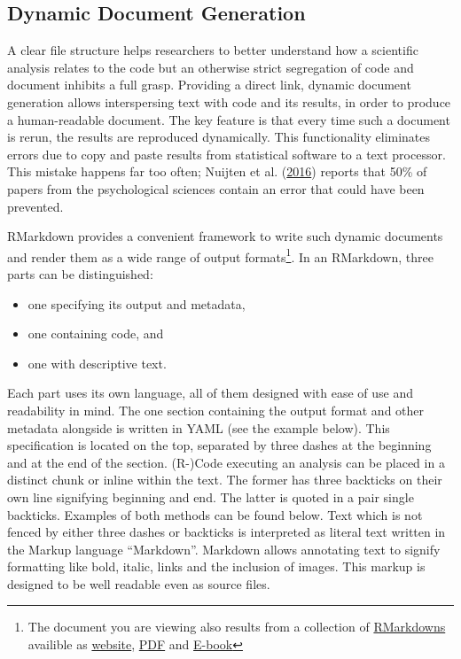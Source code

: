 \documentclass[12pt,a4paper,]{article}
\providecommand{\tightlist}{%
  \setlength{\itemsep}{0pt}\setlength{\parskip}{0pt}}
\begin{document}
\hypertarget{dynamic-document-generation}{%
\subsection{Dynamic Document Generation}\label{dynamic-document-generation}}

A clear file structure helps researchers to better understand how a scientific analysis relates to the code but an otherwise strict segregation of code and document inhibits a full grasp.
Providing a direct link, dynamic document generation allows interspersing text with code and its results, in order to produce a human-readable document.
The key feature is that every time such a document is rerun, the results are reproduced dynamically.
This functionality eliminates errors due to copy and paste results from statistical software to a text processor. This mistake happens far too often; Nuijten et al. (\protect\hyperlink{ref-nuijtenPrevalenceStatisticalReporting2016}{2016}) reports that 50\% of papers from the psychological sciences contain an error that could have been prevented.

RMarkdown provides a convenient framework to write such dynamic documents and render them as a wide range of output formats\footnote{The document you are viewing also results from a collection of \href{https://github.com/aaronpeikert/repro-thesis}{RMarkdowns} availible as \href{https://aaronpeikert.github.io/repro-thesis/}{website}, \href{https://aaronpeikert.github.io/repro-thesis/ma.pdf}{PDF} and \href{https://aaronpeikert.github.io/repro-thesis/ma.epub}{E-book}}. In an RMarkdown, three parts can be distinguished:

\begin{itemize}
\tightlist
\item
  one specifying its output and metadata,
\item
  one containing code, and
\item
  one with descriptive text.
\end{itemize}

Each part uses its own language, all of them designed with ease of use and readability in mind.
The one section containing the output format and other metadata alongside is written in YAML (see the example below).
This specification is located on the top, separated by three dashes at the beginning and at the end of the section.
(R-)Code executing an analysis can be placed in a distinct chunk or inline within the text.
The former has three backticks on their own line signifying beginning and end.
The latter is quoted in a pair single backticks.
Examples of both methods can be found below.
Text which is not fenced by either three dashes or backticks is interpreted as literal text written in the Markup language ``Markdown''.
Markdown allows annotating text to signify formatting like bold, italic, links and the inclusion of images.
This markup is designed to be well readable even as source files.
\end{document}
